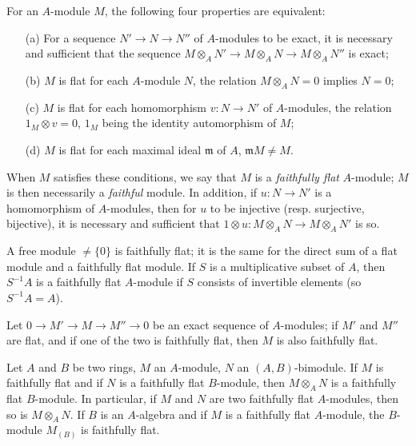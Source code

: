 \begin{env}[6.4.1]
\label{0.6.4.1}
For an $A$-module $M$, the following four properties are equivalent:
\begin{enumerate}
  \item[(a)] For a sequence $N'\to N\to N''$ of $A$-modules to be exact, it is necessary and
    sufficient that the sequence $M\otimes_A N'\to M\otimes_A N\to M\otimes_A N''$ is exact;
  \item[(b)] $M$ is flat for each $A$-module $N$, the relation $M\otimes_A N=0$ implies $N=0$;
  \item[(c)] $M$ is flat for each homomorphism $v:N\to N'$ of $A$-modules, the relation
    $1_M\otimes v=0$, $1_M$ being the identity automorphism of $M$;
  \item[(d)] $M$ is flat for each maximal ideal $\mathfrak{m}$ of $A$, $\mathfrak{m}M\neq M$.
\end{enumerate}

When $M$ satisfies these conditions, we say that $M$ is a \emph{faithfully flat} $A$-module; $M$ is then necessarily a \emph{faithful} module.
In addition, if $u:N\to N'$ is a homomorphism of $A$-modules, then for $u$ to be injective (resp. surjective, bijective), it is necessary and sufficient that $1\otimes u:M\otimes_A N\to M\otimes_A N'$ is so.
\end{env}

\begin{env}[6.4.2]
\label{0.6.4.2}
A free module $\neq\{0\}$ is faithfully flat; it is the same for the direct sum of a flat
module and a faithfully flat module. If $S$ is a multiplicative subset of $A$, then
$S^{-1}A$ is a faithfully flat $A$-module if $S$ consists of invertible elements
(so $S^{-1}A=A$).
\end{env}

\begin{env}[6.4.3]
\label{0.6.4.3}
Let $0\to M'\to M\to M''\to 0$ be an exact sequence of $A$-modules; if $M'$ and $M''$ are
flat, and if one of the two is faithfully flat, then $M$ is also faithfully flat.
\end{env}

\begin{env}[6.4.4]
\label{0.6.4.4}
Let $A$ and $B$ be two rings, $M$ an $A$-module, $N$ an $(A,B)$-bimodule. If $M$ is
faithfully flat and if $N$ is a faithfully flat $B$-module, then $M\otimes_A N$ is a
faithfully flat $B$-module. In particular, if $M$ and $N$ are two faithfully flat
$A$-modules, then so is $M\otimes_A N$. If $B$ is an $A$-algebra and if $M$ is a faithfully
flat $A$-module, the $B$-module $M_{(B)}$ is faithfully flat.
\end{env}

